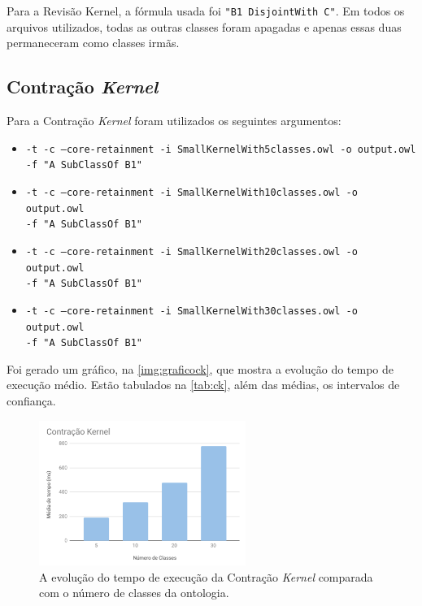 Para a Revisão Kernel, a fórmula usada foi \texttt{"B1 DisjointWith C"}. Em todos os arquivos utilizados, todas as outras classes foram apagadas e apenas essas duas permaneceram como classes irmãs.

\subsection{Contração \textit{Kernel}}

Para a Contração \textit{Kernel} foram utilizados os seguintes argumentos:

\begin{itemize}
	\item \texttt{-t -c --core-retainment -i SmallKernelWith5classes.owl -o output.owl \\ -f "A SubClassOf B1"}
	\item \texttt{-t -c --core-retainment -i SmallKernelWith10classes.owl -o output.owl \\ -f "A SubClassOf B1"}
	\item \texttt{-t -c --core-retainment -i SmallKernelWith20classes.owl -o output.owl \\ -f "A SubClassOf B1"}
	\item \texttt{-t -c --core-retainment -i SmallKernelWith30classes.owl -o output.owl \\ -f "A SubClassOf B1"}
\end{itemize}

Foi gerado um gráfico, na \autoref{img:graficock}, que mostra a evolução do tempo de execução médio. Estão tabulados na \autoref{tab:ck}, além das médias, os intervalos de confiança.

\begin{figure}[H]
	\centering
	\includegraphics[width=0.6\textwidth]{Capitulos/Testes/graficock.png}
	\caption{A evolução do tempo de execução da Contração \textit{Kernel} comparada com o número de classes da ontologia.}
	\label{img:graficock}
\end{figure}


